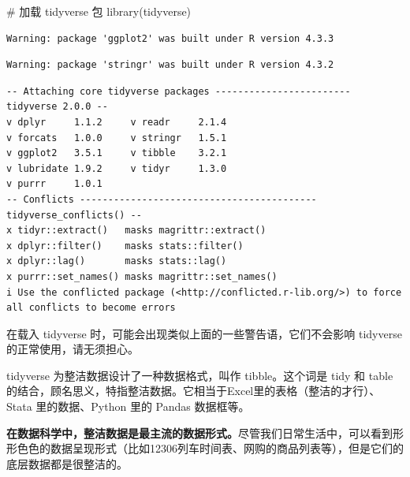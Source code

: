 \documentclass[
  letterpaper,
]{ctexbook}
\newenvironment{Shaded}{\begin{snugshade}}{\end{snugshade}}
\newcommand{\CommentTok}[1]{\textcolor[rgb]{0.37,0.37,0.37}{#1}}
\newcommand{\FunctionTok}[1]{\textcolor[rgb]{0.28,0.35,0.67}{#1}}
\newcommand{\NormalTok}[1]{\textcolor[rgb]{0.00,0.23,0.31}{#1}}
\begin{document}
\begin{Shaded}
\begin{Highlighting}[]
\CommentTok{\# 加载 tidyverse 包}
\FunctionTok{library}\NormalTok{(tidyverse)}
\end{Highlighting}
\end{Shaded}

\begin{verbatim}
Warning: package 'ggplot2' was built under R version 4.3.3
\end{verbatim}

\begin{verbatim}
Warning: package 'stringr' was built under R version 4.3.2
\end{verbatim}

\begin{verbatim}
-- Attaching core tidyverse packages ------------------------ tidyverse 2.0.0 --
v dplyr     1.1.2     v readr     2.1.4
v forcats   1.0.0     v stringr   1.5.1
v ggplot2   3.5.1     v tibble    3.2.1
v lubridate 1.9.2     v tidyr     1.3.0
v purrr     1.0.1     
-- Conflicts ------------------------------------------ tidyverse_conflicts() --
x tidyr::extract()   masks magrittr::extract()
x dplyr::filter()    masks stats::filter()
x dplyr::lag()       masks stats::lag()
x purrr::set_names() masks magrittr::set_names()
i Use the conflicted package (<http://conflicted.r-lib.org/>) to force all conflicts to become errors
\end{verbatim}

\begin{tcolorbox}[enhanced jigsaw, bottomtitle=1mm, bottomrule=.15mm, coltitle=black, title=\textcolor{quarto-callout-tip-color}{\faLightbulb}\hspace{0.5em}{提示}, toptitle=1mm, colframe=quarto-callout-tip-color-frame, colbacktitle=quarto-callout-tip-color!10!white, opacitybacktitle=0.6, arc=.35mm, opacityback=0, breakable, toprule=.15mm, left=2mm, titlerule=0mm, rightrule=.15mm, colback=white, leftrule=.75mm]

在载入 tidyverse 时，可能会出现类似上面的一些警告语，它们不会影响
tidyverse 的正常使用，请无须担心。

\end{tcolorbox}

tidyverse 为整洁数据设计了一种数据格式，叫作 tibble。这个词是 tidy 和
table
的结合，顾名思义，特指整洁数据。它相当于Excel里的表格（整洁的才行）、Stata
里的数据、Python 里的 Pandas 数据框等。

\textbf{在数据科学中，整洁数据是最主流的数据形式。}尽管我们日常生活中，可以看到形形色色的数据呈现形式（比如12306列车时间表、网购的商品列表等），但是它们的底层数据都是很整洁的。
\end{document}
